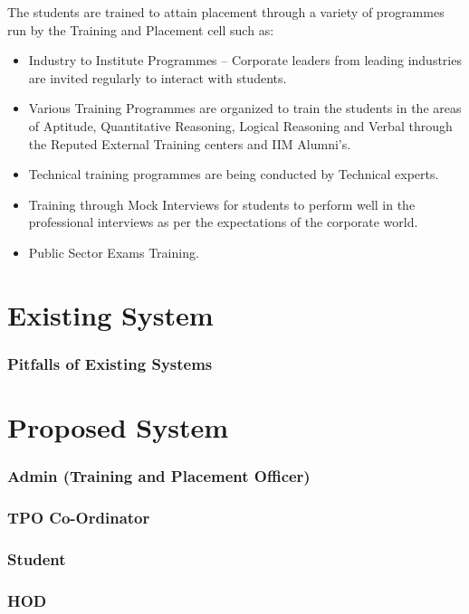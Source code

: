 \par The students are trained to attain placement through a variety of programmes run by the Training and Placement cell such as:

\begin{itemize}
\item Industry to Institute Programmes – Corporate leaders from leading industries are invited regularly to interact with students.
\item Various Training Programmes are organized to train the students in the areas of Aptitude, Quantitative Reasoning, Logical Reasoning and Verbal through the Reputed External Training centers and IIM Alumni's.
\item Technical training programmes are being conducted by Technical experts.
\item Training through Mock Interviews for students to perform well in the professional interviews as per the expectations of the corporate world.
\item Public Sector Exams Training.
\end{itemize}






\pagebreak

\section{Existing System}
\subsubsection{Pitfalls of Existing Systems}
\pagebreak
\section{Proposed System}
\subsubsection{Admin (Training and Placement Officer)}
\subsubsection{TPO Co-Ordinator}
\subsubsection{Student}
\subsubsection{HOD}



